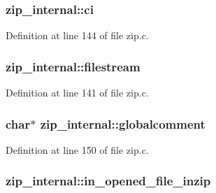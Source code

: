 \hypertarget{structzip__internal_ab087c0930e1deeaf9f3dc9199d88c18f}{
\subsubsection[{ci}]{ zip\-\_\-internal\-::ci}}\label{structzip__internal_ab087c0930e1deeaf9f3dc9199d88c18f}


Definition at line 144 of file zip.\-c.

\hypertarget{structzip__internal_a1444d3938300b2fa4e8f1e2a99475138}{
\subsubsection[{filestream}]{ zip\-\_\-internal\-::filestream}}\label{structzip__internal_a1444d3938300b2fa4e8f1e2a99475138}


Definition at line 141 of file zip.\-c.

\hypertarget{structzip__internal_a8a49f83da0affc89cfc541ab38e72471}{
\subsubsection[{globalcomment}]{\setlength{\rightskip}{0pt plus 5cm}char$\ast$ zip\-\_\-internal\-::globalcomment}}\label{structzip__internal_a8a49f83da0affc89cfc541ab38e72471}


Definition at line 150 of file zip.\-c.

\hypertarget{structzip__internal_a98dbf3927482a45adefcd32d12bd7840}{
\subsubsection[{in\-\_\-opened\-\_\-file\-\_\-inzip}]{ zip\-\_\-internal\-::in\-\_\-opened\-\_\-file\-\_\-inzip}}\label{structzip__internal_a98dbf3927482a45adefcd32d12bd7840}


